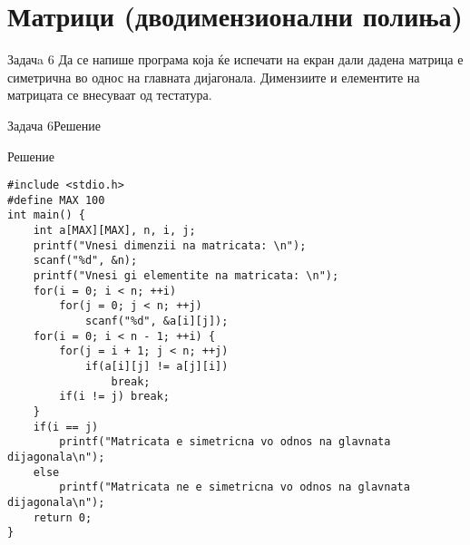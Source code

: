 \section{Матрици (дводимензионални полиња)}

\begin{frame}{Задачa 6}
Да се напише програма која ќе испечати на екран дали дадена матрица е симетрична во однос на главната дијагонала. 
Димензиите и елементите на матрицата се внесуваат од тестатура.
\end{frame}

\begin{frame}[fragile]{Задача 6}{Решение} 
\begin{exampleblock}{Решение}
\begin{lstlisting}
#include <stdio.h>
#define MAX 100
int main() {
    int a[MAX][MAX], n, i, j;
    printf("Vnesi dimenzii na matricata: \n");
    scanf("%d", &n);
    printf("Vnesi gi elementite na matricata: \n");
    for(i = 0; i < n; ++i)
        for(j = 0; j < n; ++j)
            scanf("%d", &a[i][j]);
    for(i = 0; i < n - 1; ++i) {
        for(j = i + 1; j < n; ++j)
            if(a[i][j] != a[j][i])
                break;
        if(i != j) break;
    }
    if(i == j)
        printf("Matricata e simetricna vo odnos na glavnata dijagonala\n");
    else
        printf("Matricata ne e simetricna vo odnos na glavnata dijagonala\n");
    return 0;
}
\end{lstlisting}
\end{exampleblock}
\end{frame}
\section{}

